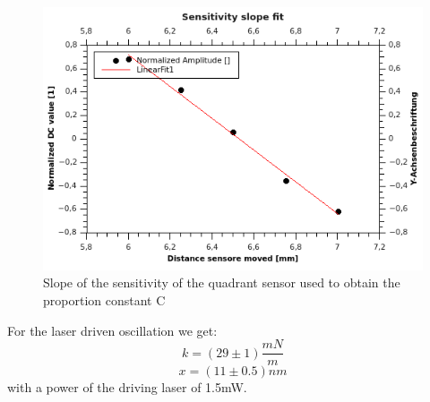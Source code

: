 \documentclass[12pt,a4paper]{article}
\begin{document}
\begin{multicols}{2}

\begin{figure}[H]
	\centering
	\includegraphics[scale=1.4]{../figures/Slopeofsensitivityofthesensor.png}
	\caption{Slope of the sensitivity of the quadrant sensor used to obtain the proportion constant C}
	\label{fig:sensorsensitivity}
\end{figure}

\noindent
For the laser driven oscillation we get:
$$k = (29 \pm 1) \frac{mN}{m}$$
$$x = (11 \pm 0.5) nm$$
with a power of the driving laser of 1.5mW.


\end{multicols}
\end{document}
